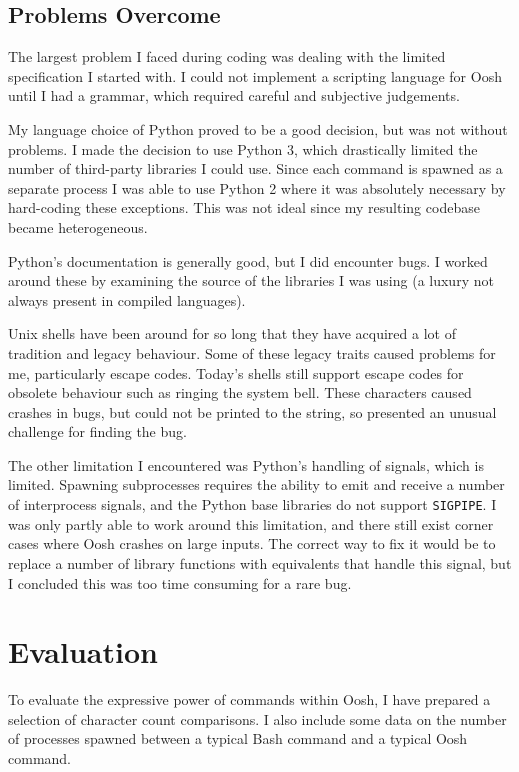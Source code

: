 \documentclass[12pt,twoside,notitlepage]{report}
\begin{document}
\section{Problems Overcome}

The largest problem I faced during coding was dealing with the limited
specification I started with. I could not implement a scripting
language for Oosh until I had a grammar, which required careful and
subjective judgements.

My language choice of Python proved to be a good decision, but was not
without problems. I made the decision to use Python 3, which
drastically limited the number of third-party libraries I could
use. Since each command is spawned as a separate process I was able to
use Python 2 where it was absolutely necessary by hard-coding these
exceptions. This was not ideal since my resulting codebase became
heterogeneous.

Python's documentation is generally good, but I did encounter bugs. I
worked around these by examining the source of the libraries I was
using (a luxury not always present in compiled languages).

Unix shells have been around for so long that they have acquired a lot
of tradition and legacy behaviour. Some of these legacy traits caused
problems for me, particularly escape codes. Today's shells still
support escape codes for obsolete behaviour such as ringing the system
bell. These characters caused crashes in bugs, but could not be
printed to the string, so presented an unusual challenge for finding
the bug.

The other limitation I encountered was Python's handling of signals,
which is limited. Spawning subprocesses requires the ability to emit
and receive a number of interprocess signals, and the Python base
libraries do not support {\tt SIGPIPE}. I was only partly able to work
around this limitation, and there still exist corner cases where Oosh
crashes on large inputs. The correct way to fix it would be to replace
a number of library functions with equivalents that handle this
signal, but I concluded this was too time consuming for a rare bug.

\cleardoublepage

\chapter{Evaluation}
To evaluate the expressive power of commands within Oosh, I have prepared a
selection of character count comparisons. I also include some data on the
number of processes spawned between a typical Bash command and a typical Oosh
command.
\end{document}

